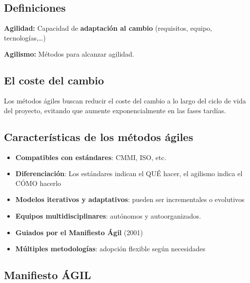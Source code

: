     \subsection{Definiciones}\label{subsec:definiciones-agiles}
    \begin{definicion}
        \textbf{Agilidad:} Capacidad de \textbf{adaptación al cambio} (requisitos, equipo, tecnologías,…)
    \end{definicion}

    \begin{definicion}
        \textbf{Agilismo:} Métodos para alcanzar agilidad.
    \end{definicion}

    \subsection{El coste del cambio}\label{subsec:el-coste-del-cambio}
    Los métodos ágiles buscan reducir el coste del cambio a lo largo del ciclo de vida del proyecto, evitando que aumente exponencialmente en las fases tardías.

    \subsection{Características de los métodos ágiles}\label{subsec:caracteristicas-de-los-metodos-agiles}

    \begin{itemize}
        \item \textbf{Compatibles con estándares}: CMMI, ISO, etc.
        \item \textbf{Diferenciación}: Los estándares indican el QUÉ hacer, el agilismo indica el CÓMO hacerlo
        \item \textbf{Modelos iterativos y adaptativos}: pueden ser incrementales o evolutivos
        \item \textbf{Equipos multidisciplinares}: autónomos y autoorganizados.
        \item \textbf{Guiados por el Manifiesto Ágil} (2001)
        \item \textbf{Múltiples metodologías}: adopción flexible según necesidades
    \end{itemize}

    \subsection{Manifiesto ÁGIL}\label{subsec:manifiesto-agil}

